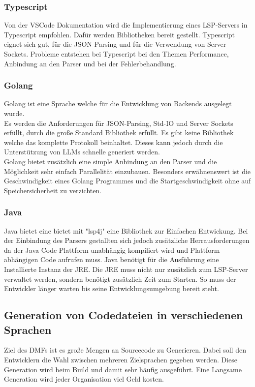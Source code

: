 \documentclass[./einleitung.tex]{subfiles}
\begin{document}
\subsubsection{Typescript}
Von der VSCode Dokumentation wird die Implementierung eines LSP-Servers in Typescript empfohlen. Dafür werden Bibliotheken bereit gestellt.
Typescript eignet sich gut, für die JSON Parsing und für die Verwendung von Server Sockets. Probleme entstehen bei Typescript bei den Themen Performance, Anbindung an den Parser und bei der Fehlerbehandlung.

\subsubsection{Golang}
Golang ist eine Sprache welche für die Entwicklung von Backends ausgelegt wurde. \\
Es werden die Anforderungen für JSON-Parsing, Std-IO und Server Sockets erfüllt, durch die große Standard Bibliothek erfüllt. Es gibt keine Bibliothek welche das komplette Protokoll beinhaltet. Dieses kann jedoch durch die Unterstützung von LLMs schnelle generiert werden.\\
Golang bietet zusätzlich eine simple Anbindung an den Parser und die Möglichkeit sehr einfach Parallelität einzubauen. Besonders erwähnenswert ist die Geschwindigkeit eines Golang Programmes und die Startgeschwindigkeit ohne auf Speichersicherheit zu verzichten.

\subsubsection{Java}
Java bietet eine bietet mit "lsp4j" eine Bibliothek zur Einfachen Entwickung. 
Bei der Einbindung des Parsers gestallten sich jedoch zusätzliche Herrausforderungen da der Java Code Plattform unabhängig kompiliert wird und Plattform abhängigen Code aufrufen muss.
Java benötigt für die Ausführung eine Installierte Instanz der JRE. Die JRE muss nicht nur zusätzlich zum LSP-Server verwaltet werden, sondern benötigt zusätzlich Zeit zum Starten. So muss der Entwickler länger warten bis seine Entwicklungsumgebung bereit steht. 


\subsection{Generation von Codedateien in verschiedenen Sprachen}
Ziel des DMFs ist es große Mengen an Sourcecode zu Generieren. Dabei soll den Entwicklern die Wahl zwischen mehreren Zielsprachen gegeben werden. Diese Generation wird beim Build und damit sehr häufig ausgeführt. Eine Langsame Generation wird jeder Organisation viel Geld kosten.
\end{document}
